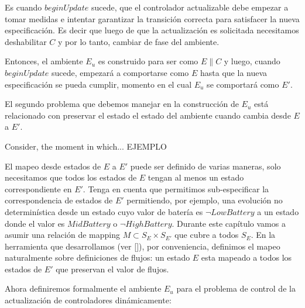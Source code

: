Es cuando $beginUpdate$ sucede, que el controlador actualizable debe empezar a tomar medidas e intentar garantizar
la transición correcta para satisfacer la nueva especificación. Es decir que luego de que la actualización es
solicitada necesitamos deshabilitar $C$ y por lo tanto, cambiar de fase del ambiente.

Entonces, el ambiente $E_u$ es construido para ser como $E\|C$ y luego, cuando $beginUpdate$ sucede, empezará a
comportarse como $E$ hasta que la nueva especificación se pueda cumplir, momento en el cual $E_u$ se comportará como
$E'$.

El segundo problema que debemos manejar en la construcción de $E_u$ está relacionado con preservar el estado el estado
del ambiente cuando cambia desde $E$ a $E'$.

Consider, the moment in which... EJEMPLO

El mapeo desde estados de $E$ a $E'$ puede ser definido de varias maneras, solo necesitamos que todos los estados de $E$
tengan al menos un estado correspondiente en $E'$. Tenga en cuenta que permitimos sub-especificar la correspondencia de
estados de $E'$ permitiendo, por ejemplo, una evolución no determinística desde un estado cuyo valor de batería es
$\lnot LowBattery$ a un estado donde el valor es $MidBattery$ o $\neg HighBattery$. Durante este capítulo vamos a asumir
una relación de mapping $M \subset S_E \times S_{E'}$ que cubre a todos $S_E$. En la herramienta que desarrollamos (ver
\ref{}), por conveniencia, definimos el mapeo naturalmente sobre definiciones de flujos: un estado $E$ esta mapeado a
todos los estados de $E'$ que preservan el valor de flujos.

Ahora definiremos formalmente el ambiente $E_u$ para el problema de control de la actualización de controladores
dinámicamente:

